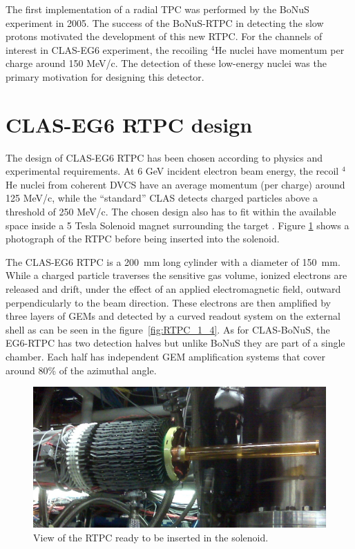 \documentclass[twocolumn,showpacs,superscriptaddress,groupedaddress]{revtex4}
\begin{document}
The first implementation of a radial TPC was  
performed by the BoNuS experiment \cite{BONUS} in 2005. The success of the 
BoNuS-RTPC in detecting the slow protons motivated the development of this new 
RTPC. For the channels of interest in CLAS-EG6 experiment, the recoiling 
$^{4}$He nuclei have momentum per charge around 150 MeV/c. The detection of 
these low-energy nuclei was the primary motivation for designing this detector. 

 
\section{CLAS-EG6 RTPC design} \label{sec_design}
The design of CLAS-EG6 RTPC has been chosen according to physics and 
experimental requirements.  At 6 GeV incident electron beam energy, the recoil 
$^{4}$He nuclei from coherent DVCS have an average momentum (per 
charge) around 125 MeV/c, while the ``standard'' CLAS detects charged particles 
above a threshold of 250 MeV/c. The chosen design also has 
to fit within the available space inside a 5 Tesla Solenoid magnet
surrounding the target \cite{Hyon-suk}. Figure \ref{fig:RTPC2} shows a photograph of the RTPC before being inserted into the solenoid. 


The CLAS-EG6 RTPC is a 200~mm long cylinder with a diameter of 150~mm. While a charged 
particle traverses the sensitive gas volume, ionized electrons are released 
and drift, under the effect of an applied electromagnetic field, outward 
perpendicularly to the beam direction. These electrons are then amplified by 
three layers of GEMs and detected by a curved readout system on the external 
shell as can be seen in the figure~\ref{fig:RTPC_1_4}. As for CLAS-BoNuS, the 
EG6-RTPC has two detection halves but unlike BoNuS they are part of a single 
chamber. Each half has independent GEM amplification systems that cover around 
80\% of the azimuthal angle.

\begin{figure}[tb]
\centering
\includegraphics[scale=0.19]{fig/RTPC_exp.png}
\caption{View of the RTPC ready to be inserted in the solenoid. } 
\label{fig:RTPC2}
\end{figure}
\end{document}
